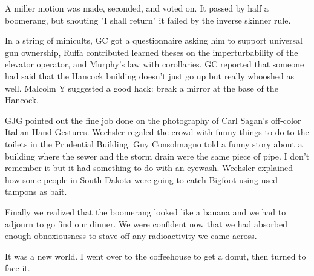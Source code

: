 \documentclass[12pt]{article}
\begin{document}
A miller motion was made, seconded, and voted on. It passed by half a boomerang, but shouting "I shall return" it failed by the inverse skinner rule.

In a string of minicults, GC got a questionnaire asking him to support universal gun ownership, Ruffa contributed learned theses on the imperturbability of the elevator operator, and Murphy's law with corollaries. GC reported that someone had said that the Hancock building doesn't just go up but really whooshed as well. Malcolm Y suggested a good hack: break a mirror at the base of the Hancock.

GJG pointed out the fine job done on the photography of Carl Sagan's off-color Italian Hand Gestures. Wechsler regaled the crowd with funny things to do to the toilets in the Prudential Building. Guy Consolmagno told a funny story about a building where the sewer and the storm drain were the same piece of pipe. I don't remember it but it had something to do with an eyewash. Wechsler explained how some people in South Dakota were going to catch Bigfoot using used tampons as bait.

Finally we realized that the boomerang looked like a banana and we had to adjourn to go find our dinner. We were confident now that we had absorbed enough obnoxiousness to stave off any radioactivity we came across.

It was a new world. I went over to the coffeehouse to get a donut, then turned to face it.
\end{document}
